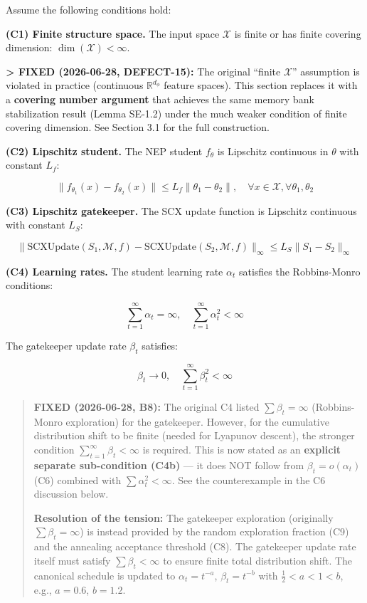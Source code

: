 \documentclass[
  12pt,
]{article}
\begin{document}
Assume the following conditions hold:

\textbf{(C1) Finite structure space.} The input space \(\mathcal{X}\) is
finite or has finite covering dimension: \(\dim(\mathcal{X}) < \infty\).

\textbf{\textgreater{} FIXED (2026-06-28, DEFECT-15):} The original
``finite \(\mathcal{X}\)'' assumption is violated in practice
(continuous \(\mathbb{R}^{d_\phi}\) feature spaces). This section
replaces it with a \textbf{covering number argument} that achieves the
same memory bank stabilization result (Lemma SE-1.2) under the much
weaker condition of finite covering dimension. See Section 3.1 for the
full construction.

\textbf{(C2) Lipschitz student.} The NEP student \(f_\theta\) is
Lipschitz continuous in \(\theta\) with constant \(L_f\):

\[
\|f_{\theta_1}(x) - f_{\theta_2}(x)\| \leq L_f \|\theta_1 - \theta_2\|, \quad \forall x \in \mathcal{X}, \forall \theta_1, \theta_2
\]

\textbf{(C3) Lipschitz gatekeeper.} The SCX update function is Lipschitz
continuous with constant \(L_S\):

\[
\|\text{SCXUpdate}(S_1, \mathcal{M}, f) - \text{SCXUpdate}(S_2, \mathcal{M}, f)\|_\infty \leq L_S \|S_1 - S_2\|_\infty
\]

\textbf{(C4) Learning rates.} The student learning rate \(\alpha_t\)
satisfies the Robbins-Monro conditions:

\[
\sum_{t=1}^\infty \alpha_t = \infty, \quad \sum_{t=1}^\infty \alpha_t^2 < \infty
\]

The gatekeeper update rate \(\beta_t\) satisfies:

\[
\beta_t \to 0, \quad \sum_{t=1}^\infty \beta_t^2 < \infty
\]

\begin{quote}
\textbf{FIXED (2026-06-28, B8):} The original C4 listed
\(\sum \beta_t = \infty\) (Robbins-Monro exploration) for the
gatekeeper. However, for the cumulative distribution shift to be finite
(needed for Lyapunov descent), the stronger condition
\(\sum_{t=1}^\infty \beta_t < \infty\) is required. This is now stated
as an \textbf{explicit separate sub-condition (C4b)} --- it does NOT
follow from \(\beta_t = o(\alpha_t)\) (C6) combined with
\(\sum \alpha_t^2 < \infty\). See the counterexample in the C6
discussion below.

\textbf{Resolution of the tension:} The gatekeeper exploration
(originally \(\sum \beta_t = \infty\)) is instead provided by the random
exploration fraction (C9) and the annealing acceptance threshold (C8).
The gatekeeper update rate itself must satisfy \(\sum \beta_t < \infty\)
to ensure finite total distribution shift. The canonical schedule is
updated to \(\alpha_t = t^{-a}\), \(\beta_t = t^{-b}\) with
\(\frac{1}{2} < a < 1 < b\), e.g., \(a = 0.6\), \(b = 1.2\).
\end{quote}
\end{document}
